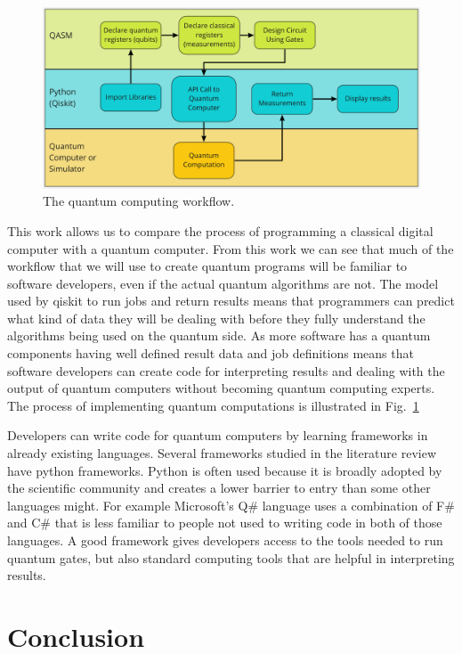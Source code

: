 \documentclass[conference]{IEEEtran}
\begin{document}
\begin{figure}[htbp]
    \centerline{\includegraphics[width=\textwidth]{qworkflow.png}}
    \caption{The quantum computing workflow.}
    \label{fig:workflow}
\end{figure}

This work allows us to compare the process of programming a classical digital computer with a quantum computer. From this work we can see that much of the workflow that we will use to create quantum programs will be familiar to software developers, even if the actual quantum algorithms are not. The model used by qiskit to run jobs and return results means that programmers can predict what kind of data they will be dealing with before they fully understand the algorithms being used on the quantum side. As more software has a quantum components having well defined result data and job definitions means that software developers can create code for interpreting results and dealing with the output of quantum computers without becoming quantum computing experts. The process of implementing quantum computations is illustrated in Fig.~\ref{fig:workflow}

Developers can write code for quantum computers by learning frameworks in already existing languages. Several frameworks studied in the literature review have python frameworks. Python is often used because it is broadly adopted by the scientific community and creates a lower barrier to entry than some other languages might. For example Microsoft's Q\# language uses a combination of F\# and C\# that is less familiar to people not used to writing code in both of those languages. A good framework gives developers access to the tools needed to run quantum gates, but also standard computing tools that are helpful in interpreting results. 

\section*{Conclusion}
\end{document}
